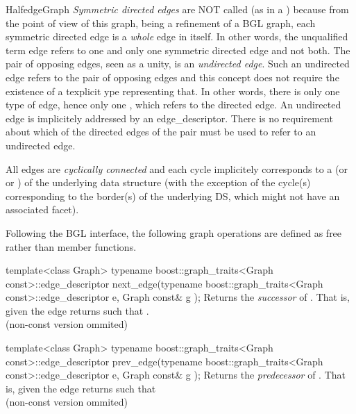 \begin{ccRefConcept}{HalfedgeGraph}
{\em Symmetric directed edges} are NOT called  (as in a ) because from the point of view of this graph, being a refinement of a BGL graph, each symmetric directed edge is a {\em whole} edge in itself. In other words, the unqualified term edge refers to one and only one symmetric directed edge and not both. The pair of opposing edges, seen as a unity, is an {\em undirected edge}. Such an undirected edge refers to the pair of opposing edges and this concept does not require the existence of a texplicit ype representing that. In other words, there is only one type of edge, hence only one , which refers to the directed edge. An undirected edge is implicitely addressed by an edge\_descriptor. There is no requirement about which of the directed edges of the pair must be used to refer to an undirected edge.

All edges are {\em cyclically connected} and each cycle implicitely corresponds to a  (or  or ) of the underlying data structure (with the exception of the cycle(s) corresponding to the border(s) of the underlying DS, which might not have an associated facet).


\ccRefines
{}

\ccTypes
  
\ccOperations

Following the BGL interface, the following graph operations are defined as free rather than member functions.

  \ccFunction
  {template<class Graph>
  typename boost::graph_traits<Graph const>::edge_descriptor 
  next_edge(typename boost::graph_traits<Graph const>::edge_descriptor e, Graph const& g );
  }
  {Returns the {\em successor} of .
  That is, given the edge  returns  such that .\\
  (non-const version ommited)
  }
  
  \ccFunction
  {template<class Graph>
  typename boost::graph_traits<Graph const>::edge_descriptor 
  prev_edge(typename boost::graph_traits<Graph const>::edge_descriptor e, Graph const& g );
  }
  {Returns the {\em predecessor} of .
  That is, given the edge  returns  such that \\
  (non-const version ommited)
  }
  

\end{ccRefConcept}
